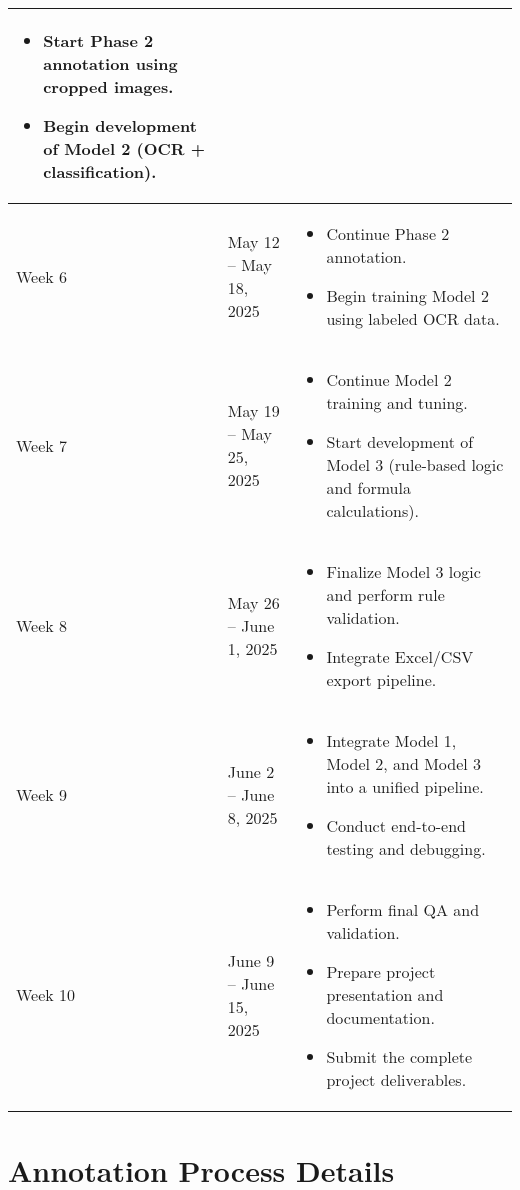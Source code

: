 \documentclass{article}
\begin{document}
\begin{longtable}{|p{2.5cm}|p{4.2cm}|p{8.5cm}|}
\begin{itemize}
    \item Start Phase 2 annotation using cropped images.
    \item Begin development of Model 2 (OCR + classification).
\end{itemize} \\
\hline
Week 6 & May 12 -- May 18, 2025 &
\begin{itemize}
    \item Continue Phase 2 annotation.
    \item Begin training Model 2 using labeled OCR data.
\end{itemize} \\
\hline
Week 7 & May 19 -- May 25, 2025 &
\begin{itemize}
    \item Continue Model 2 training and tuning.
    \item Start development of Model 3 (rule-based logic and formula calculations).
\end{itemize} \\
\hline
Week 8 & May 26 -- June 1, 2025 &
\begin{itemize}
    \item Finalize Model 3 logic and perform rule validation.
    \item Integrate Excel/CSV export pipeline.
\end{itemize} \\
\hline
Week 9 & June 2 -- June 8, 2025 &
\begin{itemize}
    \item Integrate Model 1, Model 2, and Model 3 into a unified pipeline.
    \item Conduct end-to-end testing and debugging.
\end{itemize} \\
\hline
Week 10 & June 9 -- June 15, 2025 &
\begin{itemize}
    \item Perform final QA and validation.
    \item Prepare project presentation and documentation.
    \item Submit the complete project deliverables.
\end{itemize} \\
\hline
\end{longtable}

\section*{Annotation Process Details}
\end{document}
